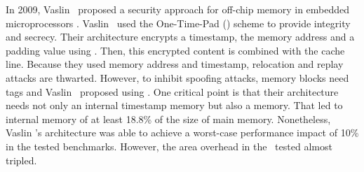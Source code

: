 In 2009, Vaslin \etal~proposed a security approach for off-chip memory in embedded microprocessors \cite{Vaslin2009:OTP}. Vaslin \etal~used the One-Time-Pad (\otp) scheme to provide integrity and secrecy. Their architecture encrypts a timestamp, the memory address and a padding value using \aes. Then, this encrypted content is combined with the cache line. Because they used memory address and timestamp, relocation and replay attacks are thwarted. However, to inhibit spoofing attacks, memory blocks need tags and Vaslin \etal~proposed using . One critical point is that their architecture needs not only an internal timestamp memory but also a  memory. That led to internal memory of at least 18.8\% of the size of main memory. Nonetheless, Vaslin \etal's architecture was able to achieve a worst-case performance impact of 10\% in the tested benchmarks. However, the area overhead in the \fpga~tested almost tripled.


